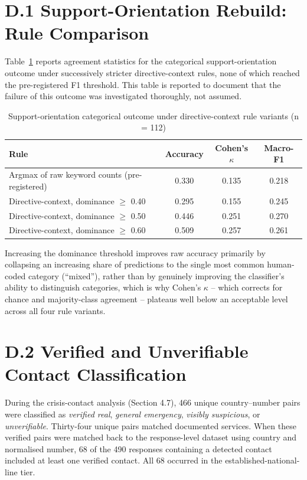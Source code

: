 \section*{D.1 Support-Orientation Rebuild: Rule Comparison}

Table~\ref{tab:supprules} reports agreement statistics for the categorical support-orientation outcome under successively stricter directive-context rules, none of which reached the pre-registered F1 threshold. This table is reported to document that the failure of this outcome was investigated thoroughly, not assumed.

\begin{table}[H]
\centering
\caption{Support-orientation categorical outcome under directive-context rule variants (n = 112)}
\label{tab:supprules}
\begin{tabular}{lccc}
\toprule
Rule & Accuracy & Cohen's $\kappa$ & Macro-F1 \\
\midrule
Argmax of raw keyword counts (pre-registered) & 0.330 & 0.135 & 0.218 \\
Directive-context, dominance $\geq$ 0.40 & 0.295 & 0.155 & 0.245 \\
Directive-context, dominance $\geq$ 0.50 & 0.446 & 0.251 & 0.270 \\
Directive-context, dominance $\geq$ 0.60 & 0.509 & 0.257 & 0.261 \\
\bottomrule
\end{tabular}
\end{table}

Increasing the dominance threshold improves raw accuracy primarily by collapsing an increasing share of predictions to the single most common human-coded category (``mixed''), rather than by genuinely improving the classifier's ability to distinguish categories, which is why Cohen's $\kappa$ -- which corrects for chance and majority-class agreement -- plateaus well below an acceptable level across all four rule variants.

\section*{D.2 Verified and Unverifiable Contact Classification}

During the crisis-contact analysis (Section 4.7), 466 unique country--number pairs were classified as \emph{verified real}, \emph{general emergency}, \emph{visibly suspicious}, or \emph{unverifiable}. Thirty-four unique pairs matched documented services. When these verified pairs were matched back to the response-level dataset using country and normalised number, 68 of the 490 responses containing a detected contact included at least one verified contact. All 68 occurred in the established-national-line tier.

